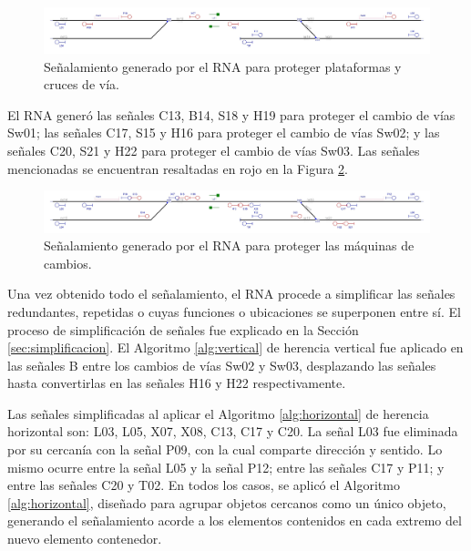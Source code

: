 	\begin{figure}[H]
		\centering
		\includegraphics[width=1\textwidth]{resultados-obtenidos/ejemplo2/images/2_step3.png}
		\centering\caption{Señalamiento generado por el RNA para proteger plataformas y cruces de vía.}
		\label{fig:EJ2_5}
	\end{figure}

	El RNA generó las señales C13, B14, S18 y H19 para proteger el cambio de vías Sw01; las señales C17, S15 y H16 para proteger el cambio de vías Sw02; y las señales C20, S21 y H22 para proteger el cambio de vías Sw03. Las señales mencionadas se encuentran resaltadas en rojo en la Figura \ref{fig:EJ2_6}.

	 \begin{figure}[H]
		\centering
		\includegraphics[width=1\textwidth]{resultados-obtenidos/ejemplo2/images/2_step4.png}
		\centering\caption{Señalamiento generado por el RNA para proteger las máquinas de cambios.}
		\label{fig:EJ2_6}
	\end{figure}

	Una vez obtenido todo el señalamiento, el RNA procede a simplificar las señales redundantes, repetidas o cuyas funciones o ubicaciones se superponen entre sí. El proceso de simplificación de señales fue explicado en la Sección \ref{sec:simplificacion}. El Algoritmo \ref{alg:vertical} de herencia vertical fue aplicado en las señales B entre los cambios de vías Sw02 y Sw03, desplazando las señales hasta convertirlas en las señales H16 y H22 respectivamente.
	
	Las señales simplificadas al aplicar el Algoritmo \ref{alg:horizontal} de herencia horizontal son: L03, L05, X07, X08, C13, C17 y C20. La señal L03 fue eliminada por su cercanía con la señal P09, con la cual comparte dirección y sentido. Lo mismo ocurre entre la señal L05 y la señal P12; entre las señales C17 y P11; y entre las señales C20 y T02. En todos los casos, se aplicó el Algoritmo \ref{alg:horizontal}, diseñado para agrupar objetos cercanos como un único objeto, generando el señalamiento acorde a los elementos contenidos en cada extremo del nuevo elemento contenedor.
	
